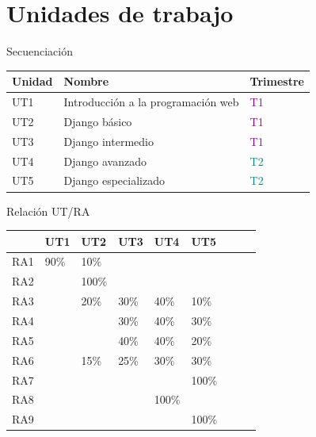\documentclass{beamer}
\begin{document}
\section{Unidades de trabajo}

\begin{frame}{Secuenciación}
    \begin{tabular}{|l|l|l|}
        \hline
        \textbf{Unidad} & \textbf{Nombre} & \textbf{Trimestre}\\
        \hline
        UT1 & Introducción a la programación web & \textcolor{purple}{T1}\\
        \hline
        UT2 & Django básico & \textcolor{purple}{T1}\\
        \hline
        UT3 & Django intermedio & \textcolor{purple}{T1}\\
        \hline
        \hline
        UT4 & Django avanzado & \textcolor{teal}{T2}\\
        \hline
        UT5 & Django especializado & \textcolor{teal}{T2}\\
        \hline
    \end{tabular}
\end{frame}

\begin{frame}{Relación UT/RA}
    \begin{tabular}{|l|l|l|l|l|l|l|l|l|}
        \hline
            & UT1  & UT2   & UT3  & UT4   & UT5\\
        \hline
        RA1 & 90\% & 10\%  &      &       &\\
        \hline
        RA2 &      & 100\% &      &       &\\
        \hline
        RA3 &      & 20\%  & 30\% & 40\%  & 10\%\\
        \hline
        RA4 &      &       & 30\% & 40\%  & 30\%\\
        \hline
        RA5 &      &       & 40\% & 40\%  & 20\%\\
        \hline
        RA6 &      & 15\%  & 25\% & 30\%  & 30\%\\
        \hline
        RA7 &      &       &      &       & 100\%\\
        \hline
        RA8 &      &       &      & 100\% &\\
        \hline
        RA9 &      &       &      &       & 100\%\\
        \hline
    \end{tabular}
\end{frame}
\end{document}

